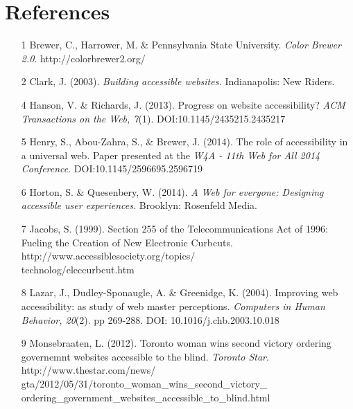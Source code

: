 \documentclass{acm_proc_article-sp}
\begin{document}
\section{References}
\begin{itemize}
\item[1] Brewer, C., Harrower, M. \& Pennsylvania State University. {\it Color Brewer 2.0}. http://colorbrewer2.org/
\item[2] Clark, J. (2003). {\it Building accessible websites.} Indianapolis: New Riders.
\item[4] Hanson, V. \& Richards, J. (2013). Progress on website accessibility? {\it ACM Transactions on the Web, 7}(1). DOI:10.1145/2435215.2435217 
\item[5] Henry, S., Abou-Zahra, S., \& Brewer, J. (2014). The role of accessibility in a universal web. Paper presented at the {\it W4A - 11th Web for All 2014 Conference}. DOI:10.1145/2596695.2596719
\item[6] Horton, S. \& Quesenbery, W. (2014). {\it A Web for everyone: Designing accessible user experiences.} Brooklyn: Rosenfeld Media.
\item[7] Jacobs, S. (1999). Section 255 of the Telecommunications Act of 1996: Fueling the Creation of New Electronic Curbcuts. http://www.accessiblesociety.org/topics/\\technolog/eleccurbcut.htm 
\item[8] Lazar, J., Dudley-Sponaugle, A. \& Greenidge, K. (2004). Improving web accessibility: as study of web master perceptions. {\it Computers in Human Behavior, 20}(2). pp 269-288. DOI: 10.1016/j.chb.2003.10.018 
\item[9] Monsebraaten, L. (2012). Toronto woman wins second victory ordering governemnt websites accessible to the blind. {\it Toronto Star}. http://www.thestar.com/news/\\gta/2012/05/31/toronto\_woman\_wins\_second\_victory\_\\ordering\_government\_websites\_accessible\_to\_blind.html

\end{itemize}
\end{document}
